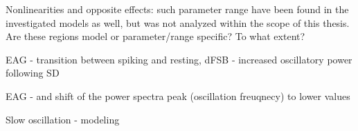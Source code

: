 \documentclass[../main.tex]{subfiles}
\begin{document}
Nonlinearities and opposite effects: such parameter range have been found in the investigated models as well, but was not analyzed within the scope of this thesis. Are these regions model or parameter/range specific? To what extent?

EAG - transition between spiking and resting, dFSB - increased oscillatory power following SD

EAG - and shift of the power spectra peak (oscillation freuqnecy) to lower values

Slow oscillation - modeling

\color{red}

\end{document}
